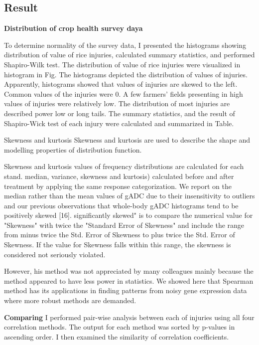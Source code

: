 \subsection*{Result}

\textbf{Distribution of crop health survey daya}

To determine normality of the survey data, I presented the histograms showing distribution of value of rice injuries, calculated summary statistics, and performed Shapiro-Wilk test. The distribution of value of rice injuries were visualized in histogram in Fig. The histograms depicted the distribution of values of injuries. Apparently, histograms showed that values of injuries are skewed to the left. Common values of the injuries were 0. A few farmers’ fields presenting in high values of injuries were relatively low. The distribution of most injuries are described power low or long tails. The summary statistics, and the result of Shapiro-Wick test of each injury were calculated and summarized in Table. 




Skewness and kurtosis Skewness and kurtosis are used to describe the shape and modelling properties of distribution function. \citep{Doane_2011_Measuring}

Skewness and kurtosis values of frequency distributions are calculated for each stand. median, variance, skewness and kurtosis) calculated before and after treatment by applying the same response categorization. We report on the median rather than the mean values of gADC due to their insensitivity to outliers and our previous observations that whole-body gADC histograms tend to be positively skewed [16]. significantly skewed" is to compare the numerical value for "Skewness" with twice the "Standard Error of Skewness" and include the range from minus twice the Std. Error of Skewness to plus twice the Std. Error of Skewness. If the value for Skewness falls within this range, the skewness is considered not seriously violated.



However, his method was not appreciated by many colleagues mainly because the method appeared to have less power in statistics. We showed here that Spearman method has its applications in finding patterns from noisy gene expression data where more robust methods are demanded.

\textbf{Comparing}
I performed pair-wise analysis between each of injuries using all four correlation methods. The output for each method was sorted by p-values in ascending order. I then examined the similarity of correlation coefficients.

